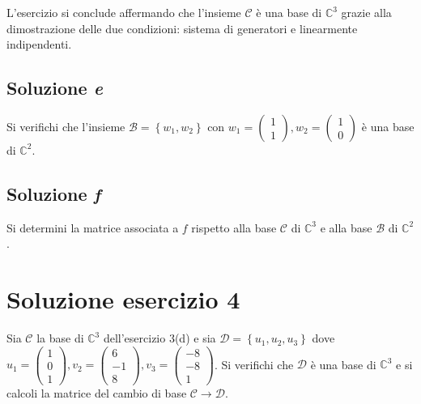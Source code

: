 \documentclass[a4paper]{article}
\begin{document}
	\noindent
	L'esercizio si conclude affermando che l'insieme $\mathscr{C}$ è una base di $\mathbb{C}^{3}$ grazie alla dimostrazione delle due condizioni: sistema di generatori e linearmente indipendenti.\newpage
	
	\subsection{Soluzione \emph{e}}
	
	Si verifichi che l'insieme $\mathscr{B} = \left\{w_{1}, w_{2}\right\}$ con $w_{1} = \begin{pmatrix}
		1 \\ 1
	\end{pmatrix}, w_{2} = \begin{pmatrix}
		1 \\ 0
	\end{pmatrix}$ è una base di $\mathbb{C}^{2}$.
	
	\subsection{Soluzione \emph{f}}
	
	Si determini la matrice associata a $f$ rispetto alla base $\mathscr{C}$ di $\mathbb{C}^{3}$ e alla base $\mathscr{B}$ di $\mathbb{C}^{2}$.
	
	\section{Soluzione esercizio 4}
	
	Sia $\mathscr{C}$ la base di $\mathbb{C}^{3}$ dell'esercizio 3(d) e sia $\mathscr{D} = \left\{u_{1}, u_{2}, u_{3}\right\}$ dove $u_{1} = \begin{pmatrix}
		1 \\ 0 \\ 1
	\end{pmatrix}, v_{2} = \begin{pmatrix}
		6 \\ -1 \\ 8
	\end{pmatrix}, v_{3} = \begin{pmatrix}
		-8 \\ -8 \\ 1
	\end{pmatrix}$. Si verifichi che $\mathscr{D}$ è una base di $\mathbb{C}^{3}$ e si calcoli la matrice del cambio di base $\mathscr{C} \rightarrow \mathscr{D}$.
\end{document}
